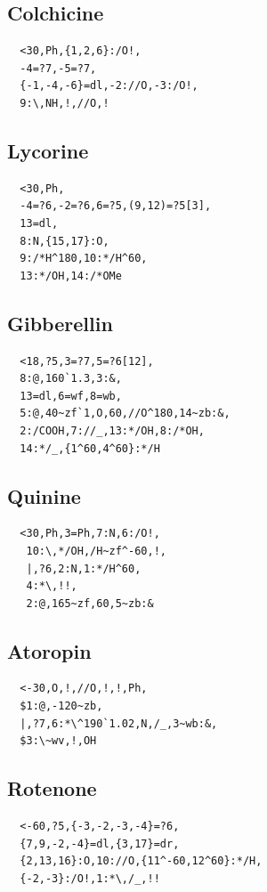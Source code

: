 \documentclass[a4paper]{article}
\makeatletter
\def\MCFstructure{\hspace{5mm}{\@strufont\char\fontnum}\advance\fontnum\@ne\relax}%
\makeatother
\begin{document}
\subsection{Colchicine}
\begin{verbatim}
  <30,Ph,{1,2,6}:/O!,
  -4=?7,-5=?7,
  {-1,-4,-6}=dl,-2://O,-3:/O!,
  9:\,NH,!,//O,!
\end{verbatim}
\MCFstructure
\subsection{Lycorine}
\begin{verbatim}
  <30,Ph,
  -4=?6,-2=?6,6=?5,(9,12)=?5[3],
  13=dl,
  8:N,{15,17}:O,
  9:/*H^180,10:*/H^60,
  13:*/OH,14:/*OMe
\end{verbatim}
\MCFstructure
\subsection{Gibberellin}
\begin{verbatim}
  <18,?5,3=?7,5=?6[12],
  8:@,160`1.3,3:&,
  13=dl,6=wf,8=wb,
  5:@,40~zf`1,O,60,//O^180,14~zb:&,
  2:/COOH,7://_,13:*/OH,8:/*OH,
  14:*/_,{1^60,4^60}:*/H
\end{verbatim}
\MCFstructure
\subsection{Quinine}
\begin{verbatim}
  <30,Ph,3=Ph,7:N,6:/O!,
   10:\,*/OH,/H~zf^-60,!,
   |,?6,2:N,1:*/H^60,
   4:*\,!!,
   2:@,165~zf,60,5~zb:&
\end{verbatim}
\MCFstructure
\subsection{Atoropin}
\begin{verbatim}
  <-30,O,!,//O,!,!,Ph,
  $1:@,-120~zb,
  |,?7,6:*\^190`1.02,N,/_,3~wb:&,
  $3:\~wv,!,OH
\end{verbatim}
\MCFstructure
\subsection{Rotenone}
\begin{verbatim}
  <-60,?5,{-3,-2,-3,-4}=?6,
  {7,9,-2,-4}=dl,{3,17}=dr,
  {2,13,16}:O,10://O,{11^-60,12^60}:*/H,
  {-2,-3}:/O!,1:*\,/_,!!
\end{verbatim}
\MCFstructure
\end{document}
